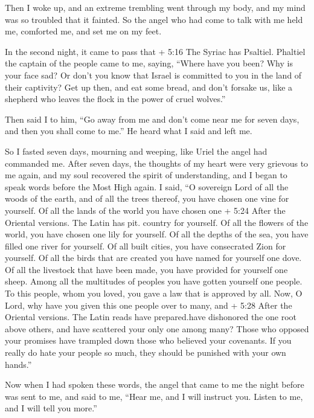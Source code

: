  Then I woke up, and an extreme trembling went through my
body, and my mind was so troubled that it fainted.  So the
angel who had come to talk with me held me, comforted me, and set me on
my feet.

 In the second night, it came to pass that + 5:16 The
Syriac has Psaltiel. Phaltiel the captain of the people came to me,
saying, ``Where have you been? Why is your face sad?  Or
don't you know that Israel is committed to you in the land of their
captivity?  Get up then, and eat some bread, and don't
forsake us, like a shepherd who leaves the flock in the power of cruel
wolves.''

 Then said I to him, ``Go away from me and don't come near
me for seven days, and then you shall come to me.'' He heard what I said
and left me.

 So I fasted seven days, mourning and weeping, like Uriel
the angel had commanded me.  After seven days, the thoughts
of my heart were very grievous to me again,  and my soul
recovered the spirit of understanding, and I began to speak words before
the Most High again.  I said, ``O sovereign Lord of all the
woods of the earth, and of all the trees thereof, you have chosen one
vine for yourself.  Of all the lands of the world you have
chosen one + 5:24 After the Oriental versions. The Latin has pit.
country for yourself. Of all the flowers of the world, you have chosen
one lily for yourself.  Of all the depths of the sea, you
have filled one river for yourself. Of all built cities, you have
consecrated Zion for yourself.  Of all the birds that are
created you have named for yourself one dove. Of all the livestock that
have been made, you have provided for yourself one sheep. 
Among all the multitudes of peoples you have gotten yourself one people.
To this people, whom you loved, you gave a law that is approved by all.
 Now, O Lord, why have you given this one people over to
many, and + 5:28 After the Oriental versions. The Latin reads have
prepared.have dishonored the one root above others, and have scattered
your only one among many?  Those who opposed your promises
have trampled down those who believed your covenants.  If
you really do hate your people so much, they should be punished with
your own hands.''

 Now when I had spoken these words, the angel that came to
me the night before was sent to me,  and said to me, ``Hear
me, and I will instruct you. Listen to me, and I will tell you more.''

